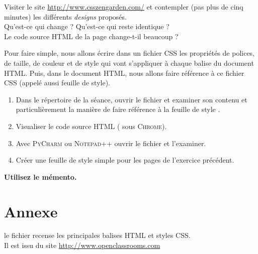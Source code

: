\documentclass[a4paper,12pt,french]{book}
\begin{document}
\begin{exercice}
Visiter le site \url{http://www.csszengarden.com/} et contempler (pas plus de cinq minutes) les différents \textit{designs} proposés.\\
Qu'est-ce qui change ? Qu'est-ce qui reste identique ?\\
Le code source \textsc{HTML} de la page change-t-il beaucoup ?
\end{exercice}
	
	
	Pour faire simple, nous allons écrire dans un fichier CSS les propriétés de polices, de taille, de couleur et de style qui vont s'appliquer à 
	chaque balise du document \textsc{HTML}. Puis, dans 
	le document \textsc{HTML}, nous allons faire référence à ce fichier CSS (appelé aussi feuille de style).
	
\begin{exercice}
	\begin{enumerate}[--]
		\item 	Dans le répertoire  de la séance, ouvrir le fichier  et examiner son contenu et 
		particulièrement 
		la manière de faire référence à la feuille de style .
		\item 	Visualiser le code source \textsc{HTML} ( sous \textsc{Chrome}).
		\item 	Avec \textsc{PyCharm} ou \textsc{Notepad++} ouvrir le fichier  et l'examiner.
		\item 	Créer une feuille de style simple pour les pages de l'exercice précédent.\\
	\end{enumerate}
		\textbf{Utilisez le mémento.}
\end{exercice}
\section{Annexe}

le fichier  recense les principales balises \textsc{HTML} et styles CSS.\\
Il est issu du site \url{http://www.openclassrooms.com}
\end{document}
